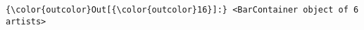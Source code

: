 \documentclass[11pt]{article}
\begin{document}
\begin{Verbatim}[commandchars=\\\{\}]
{\color{outcolor}Out[{\color{outcolor}16}]:} <BarContainer object of 6 artists>
\end{Verbatim}
            
    \begin{center}
    \end{center}
    { \hspace*{\fill} \\}
    

    
    
    
    
\end{document}
